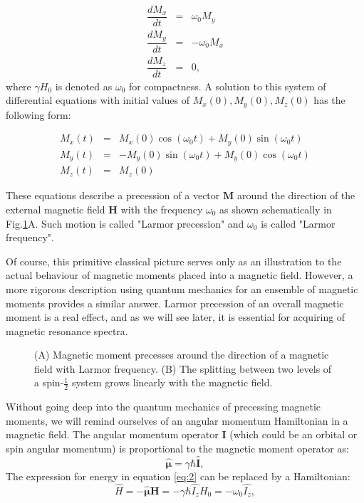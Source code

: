 \documentclass[a4paper, 12pt]{article}
\begin{document}
\begin{equation} \label{precession}
\begin{array}{lcl}
\dfrac{dM_x}{dt} & = & \omega_0 M_y \\
\dfrac{dM_y}{dt} & = & -\omega_0 M_x \\
\dfrac{dM_z}{dt} & = & 0,
\end{array}
\end{equation}
where $\gamma H_0$ is denoted as $\omega_0$ for compactness.
A solution to this system of differential equations with initial values of $M_x(0), M_y(0), M_z(0)$ has the following form:

\begin{equation} 
\begin{array}{lcl}
M_x(t) &=& M_x(0) \cos(\omega_0 t) + M_y(0) \sin (\omega_0 t) \\
M_y(t) &=& -M_y(0) \sin(\omega_0 t) + M_y(0) \cos (\omega_0 t) \\
M_z(t) &=& M_z(0) 
\end{array}
\end{equation}

These equations describe a precession of a vector $\bm{M}$ around the direction of the external magnetic field $\bm{H}$ with the frequency $\omega_0$ as shown schematically in Fig.\ref{fig:precession}A. Such motion is called  "Larmor precession" and $\omega_0$ is called "Larmor frequency".

Of course, this primitive classical picture serves only as an illustration to the actual behaviour of magnetic moments placed into a magnetic field. However, a more rigorous description using quantum mechanics for an ensemble of magnetic moments provides a similar answer. Larmor precession of an overall magnetic moment is a real effect, and as we will see later, it is essential for acquiring of magnetic resonance spectra.

\begin{figure}[ht]
\caption{(A) Magnetic moment precesses around the direction of a magnetic field with Larmor frequency. (B) The splitting between two levels of a spin-$\frac{1}{2}$ system grows linearly with the magnetic field.}
\label{fig:precession}
\centering
\end{figure}

Without going deep into the quantum mechanics of precessing magnetic moments, we will remind ourselves of an angular momentum Hamiltonian in a magnetic field. The angular momentum operator $\bm{I}$ (which could be an orbital or spin angular momentum) is proportional to the magnetic moment operator as:
\begin{equation} \label{eq:3}
\bm{\hat{\mu}} = \gamma \hbar \bm{\hat{I}},
\end{equation}
The expression for energy in equation \ref{eq:2} can be replaced by a Hamiltonian:
\begin{equation} \label{eq:2level}
\hat{H} = -\bm{\hat{\mu}} \bm{H} = -\gamma \hbar \hat{I_z} H_0 = -\omega_0 \hat{I_z},
\end{equation}
\end{document}
